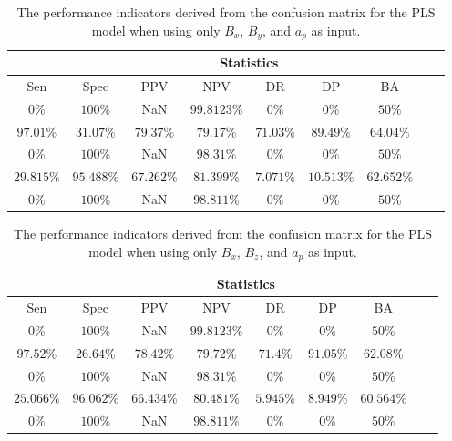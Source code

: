 \begin{table}[!ht]
	\centering
	\begin{tabular}{|c|c|c|c|c|c|c|c|c|}
		\hline
		 & \multicolumn{7}{c|}{Statistics} \\ \hline
		Sen & Spec & PPV & NPV & DR & DP & BA \\ \hline
		$0\%$ & $100\%$ & NaN & $99.8123\%$ & $0\%$ & $0\%$ & $50\%$ \\ \hline
		$97.01\%$ & $31.07\%$ & $79.37\%$ & $79.17\%$ & $71.03\%$ & $89.49\%$ & $64.04\%$ \\ \hline
		$0\%$ & $100\%$ & NaN & $98.31\%$ & $0\%$ & $0\%$ & $50\%$ \\ \hline
		$29.815\%$ & $95.488\%$ & $67.262\%$ & $81.399\%$ & $7.071\%$ & $10.513\%$ & $62.652\%$ \\ \hline
		$0\%$ & $100\%$ & NaN & $98.811\%$ & $0\%$ & $0\%$ & $50\%$ \\ \hline
	\end{tabular}
	\caption{The performance indicators derived from the confusion matrix for the PLS model when using only $B_{x}$, $B_{y}$, and $a_{p}$ as input.}
	\label{tab:cs:xyap:pls}
\end{table}

\begin{table}[!ht]
	\centering
	\begin{tabular}{|c|c|c|c|c|c|c|c|c|}
		\hline
		 & \multicolumn{7}{c|}{Statistics} \\ \hline
		Sen & Spec & PPV & NPV & DR & DP & BA \\ \hline
		$0\%$ & $100\%$ & NaN & $99.8123\%$ & $0\%$ & $0\%$ & $50\%$ \\ \hline
		$97.52\%$ & $26.64\%$ & $78.42\%$ & $79.72\%$ & $71.4\%$ & $91.05\%$ & $62.08\%$ \\ \hline
		$0\%$ & $100\%$ & NaN & $98.31\%$ & $0\%$ & $0\%$ & $50\%$ \\ \hline
		$25.066\%$ & $96.062\%$ & $66.434\%$ & $80.481\%$ & $5.945\%$ & $8.949\%$ & $60.564\%$ \\ \hline
		$0\%$ & $100\%$ & NaN & $98.811\%$ & $0\%$ & $0\%$ & $50\%$ \\ \hline
	\end{tabular}
	\caption{The performance indicators derived from the confusion matrix for the PLS model when using only $B_{x}$, $B_{z}$, and $a_{p}$ as input.}
	\label{tab:cs:xzap:pls}
\end{table}

